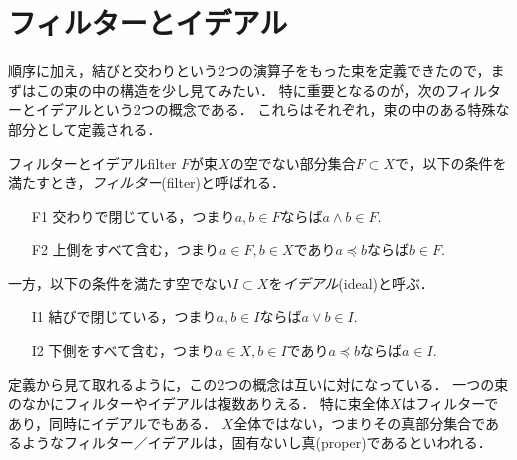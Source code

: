 \documentclass[11pt,a4paper, dvipdfmx]{jsarticle}
\begin{document}
\section{フィルターとイデアル}
順序に加え，結びと交わりという2つの演算子をもった束を定義できたので，まずはこの束の中の構造を少し見てみたい．
特に重要となるのが，次のフィルターとイデアルという2つの概念である．
これらはそれぞれ，束の中のある特殊な部分として定義される．
\begin{dfn}{フィルターとイデアル}{filter}
$F$が束$X$の空でない部分集合$F \subset X$で，以下の条件を満たすとき，\emph{フィルター}(filter)と呼ばれる．
\begin{enumerate}
    \item[F1] 交わりで閉じている，つまり$a, b \in F$ならば$a \wedge b \in F$.
    \item[F2] 上側をすべて含む，つまり$a \in F, b \in X$であり$a \preceq b$ならば$b \in F$.
\end{enumerate}
一方，以下の条件を満たす空でない$I \subset X$を\emph{イデアル}(ideal)と呼ぶ．
\begin{enumerate}
    \item[I1] 結びで閉じている，つまり$a, b \in I$ならば$a \vee b \in I$.
    \item[I2] 下側をすべて含む，つまり$a \in X, b \in I$であり$a \preceq b$ならば$a \in I$.
\end{enumerate}
\end{dfn}

定義から見て取れるように，この2つの概念は互いに対になっている．
一つの束のなかにフィルターやイデアルは複数ありえる．
特に束全体$X$はフィルターであり，同時にイデアルでもある．
$X$全体ではない，つまりその真部分集合であるようなフィルター／イデアルは，固有ないし真(proper)であるといわれる．
\end{document}
